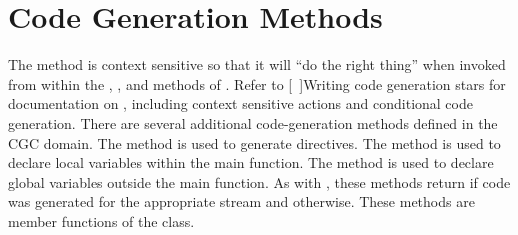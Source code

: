 \section{Code Generation Methods}
\label{CGC Code Generation Methods}

The  method is context sensitive so that it will ``do the
right thing'' when invoked from within the , ,
and  methods of .  Refer to
[~\Ref]{Writing code generation stars}
for documentation on , including
context sensitive actions and conditional code generation.  There are
several additional code-generation methods defined in the CGC domain.
The  method is used to generate  directives.  The  method is used to
declare local variables within the main function.  The 
method is used to declare global variables outside the main function.
As with , these methods return  if code was
generated for the appropriate stream and  otherwise.  These
methods are member functions of the  class.

